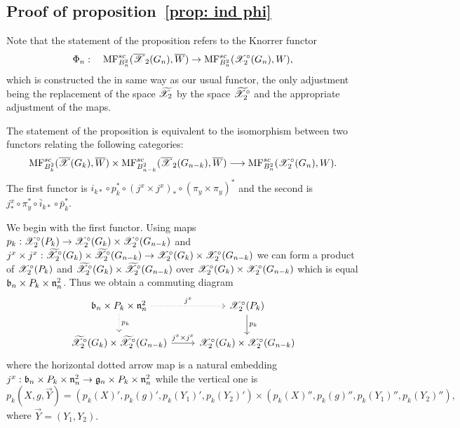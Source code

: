 \subsection{Proof of proposition~\ref{prop: ind phi}}
Note that the statement of the proposition refers to the Knorrer functor
$$\Phi_n:\quad \mathrm{MF}^{sc}_{B_n^2}(\overline{\mathscr{X}}_2(G_n),\overline{W})\to \mathrm{MF}^{sc}_{B_n^2}(\mathscr{X}^\circ_2(G_n),W),$$
which is constructed the in same way as our usual functor, the only adjustment being
the replacement of the
space $\widetilde{\mathscr{X}}_2$ by the space $\widetilde{\mathscr{X}}_2^\circ$ and the appropriate adjustment of the maps.

The statement of the proposition is equivalent to the isomorphism between two functors relating the following categories:
$$\mathrm{MF}^{sc}_{B_k^2}(\overline{\mathscr{X}}(G_k),\overline{W})\times \mathrm{MF}^{sc}_{B_{n-k}^2}(\overline{\mathscr{X}}_2(G_{n-k}),\overline{W})\longrightarrow \mathrm{MF}^{sc}_{B_n^2}(\mathscr{X}^\circ_2(G_n),W).$$
The first functor is $ i_{k*}\circ p_k^*\circ (j^x\times j^x)_*\circ (\pi_y\times\pi_y)^*$ and the second is $j^x_*\circ \pi_y^*\circ\bar{i}_{k*}\circ \bar{p}_k^*$.

We begin with the first functor. Using maps $p_k:\mathscr{X}^\circ_2(P_k)\to \mathscr{X}^\circ_2(G_k)\times \mathscr{X}^\circ_2(G_{n-k})$ and
$j^x\times j^x: \widetilde{\mathscr{X}}_2^\circ(G_k)\times \widetilde{\mathscr{X}}_2^\circ(G_{n-k})\to \mathscr{X}^\circ_2(G_k)\times \mathscr{X}^\circ_2(G_{n-k})$ we can form
 a product of $\mathscr{X}^\circ_2(P_k)$ and $ \widetilde{\mathscr{X}}_2^\circ(G_k)\times \widetilde{\mathscr{X}}_2^\circ(G_{n-k})$ over $\mathscr{X}^\circ_2(G_k)\times \mathscr{X}^\circ_2(G_{n-k})$ which is
 equal $\mathfrak{b}_n\times P_k\times \mathfrak{n}_n^2$. Thus we obtain a commuting diagram
 $$ \begin{tikzcd}
 \frb_n\times P_k\times \frn_n^2 
 \arrow[dotted]{r}{j^x} 
 \arrow[dotted]{d}{p_k}   & \calX^\circ_2(P_k)\arrow{d}{p_k}\\
\widetilde{\calX}_2^\circ(G_k)\times \widetilde{\calX}_2^\circ(G_{n-k})\arrow{r}{j^x\times j^x} &                                  \calX^\circ_2(G_k)\times \calX^\circ_2(G_{n-k})
 \end{tikzcd}$$
where the horizontal dotted arrow map is a natural embedding $j^x: \mathfrak{b}_n\times P_k\times \mathfrak{n}_n^2\to \mathfrak{g}_n\times P_k\times \mathfrak{n}_n^2$ while the vertical one is
$$p_k(X,g,\vec{Y})=(p_k(X)',p_k(g)',p_k(Y_1)',p_k(Y_2)')\times(p_k(X)'',p_k(g)'',p_k(Y_1)'',p_k(Y_2)''),$$
where \(\vec{Y}=(Y_1,Y_2).\)

